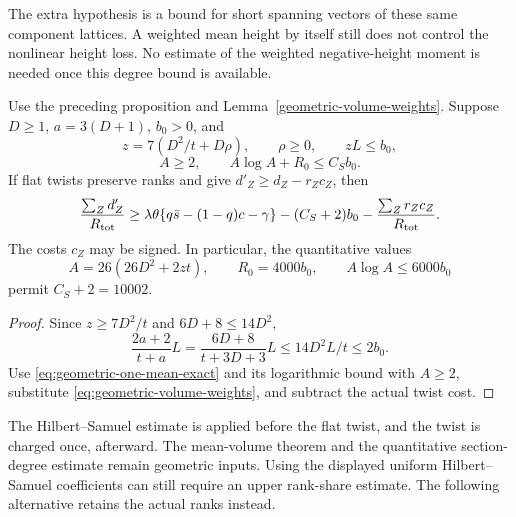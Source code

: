 The extra hypothesis is a bound for short spanning vectors of these
same component lattices. A weighted mean height by itself still does
not control the nonlinear height loss. No estimate of the weighted
negative-height moment is needed once this degree bound is available.

\begin{corollary}
\label{geometric-one-mean-scale}
Use the preceding proposition and Lemma~\ref{geometric-volume-weights}.
Suppose $D\ge1$, $a=3(D+1)$, $b_0>0$, and
\[
 z=7(D^2/t+D\rho),\qquad \rho\ge0,\qquad zL\le b_0,
\]
\[
 A\ge2,\qquad A\log A+R_0\le C_Sb_0.
\]
If flat twists preserve ranks and give $d'_Z\ge d_Z-r_Zc_Z$,
then
\begin{equation}\label{eq:geometric-direct-degree}
 \frac{\sum_Zd'_Z}{R_{\rm tot}}
 \ge\lambda\theta\{q\bar s-(1-q)c-\gamma\}
       -(C_S+2)b_0-\frac{\sum_Zr_Zc_Z}{R_{\rm tot}}.
\end{equation}
The costs $c_Z$ may be signed. In particular, the quantitative values
\[
 A=26(26D^2+2zt),\qquad R_0=4000b_0,\qquad
 A\log A\le6000b_0
\]
permit $C_S+2=10002$.
\end{corollary}
\begin{proof}
Since $z\ge7D^2/t$ and $6D+8\le14D^2$,
\[
 \frac{2a+2}{t+a}L
 =\frac{6D+8}{t+3D+3}L\le14D^2L/t\le2b_0.
\]
Use \eqref{eq:geometric-one-mean-exact} and its logarithmic bound
with $A\ge2$, substitute \eqref{eq:geometric-volume-weights}, and
subtract the actual twist cost.
\end{proof}

The Hilbert--Samuel estimate is applied before the flat twist, and
the twist is charged once, afterward. The mean-volume theorem and
the quantitative section-degree estimate remain geometric inputs.
Using the displayed uniform Hilbert--Samuel coefficients can still
require an upper rank-share estimate. The following alternative
retains the actual ranks instead.

